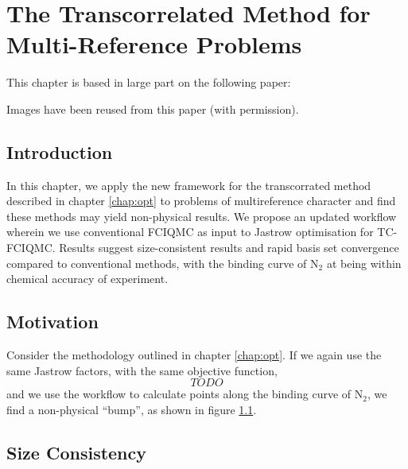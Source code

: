 \chapter{The Transcorrelated Method for Multi-Reference Problems}
  \label{chap:binding}

This chapter is based in large part on the following paper:\\

Images have been reused from this paper (with permission).

\section{Introduction}

In this chapter, we apply the new framework for the transcorrated method described in chapter \ref{chap:opt} to problems of multireference character and find these methods may yield non-physical results. We propose an updated workflow wherein we use conventional FCIQMC as input to Jastrow optimisation for TC-FCIQMC. Results suggest size-consistent results and rapid basis set convergence compared to conventional methods, with the binding curve of N$_2$ at \avtz being within chemical accuracy of experiment.

\section{Motivation}

Consider the methodology outlined in chapter \ref{chap:opt}. If we again use the same Jastrow factors,
with the same objective function,
\begin{equation}
\label{eq:varref_hf}
TODO
\end{equation}
and we use the workflow to calculate points along the binding curve of N$_2$, we find a non-physical ``bump'', as shown in figure \ref{fig:binding-dip}.

\begin{figure}[htbp]
    \centering

    \caption{}
    \label{fig:binding-dip}
\end{figure}


\section{Size Consistency}

